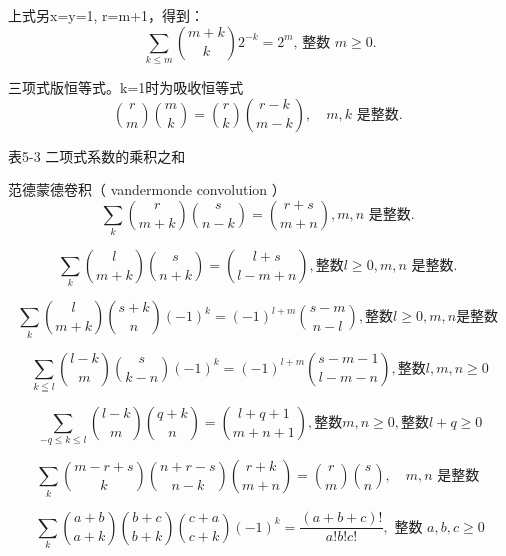 上式另x=y=1, r=m+1，得到：
\begin{equation}
    \sum_{k \leqslant m}{m+k \choose k} 2^{-k}=2^{m} \text {, 整数 } m \geqslant 0 .
\end{equation}

三项式版恒等式。k=1时为吸收恒等式
\begin{equation}
    {r \choose m}{m \choose k}={r \choose k}{r-k \choose m-k}, \quad m, k \text { 是整数. }
\end{equation}

表5-3 二项式系数的乘积之和

范德蒙德卷积（ vandermonde convolution ）
\begin{equation}
    \sum_{k}{r \choose m+k}{s \choose n-k}={r+s \choose m+n}, m, n \text { 是整数. }
\end{equation}

\begin{equation}
    \sum_{k}{l \choose m+k}{s \choose n+k}={l+s \choose l-m+n}, \text {整数} l \geqslant 0, m, n \text { 是整数. }
\end{equation}

\begin{equation}
\sum_{k}{l \choose m+k}{s+k \choose n}(-1)^{k}=(-1)^{l+m}{s-m \choose n-l}, \text{整数} l \geqslant 0, m, n\text{是整数 }
\end{equation}

\begin{equation}
    \sum_{k \leqq l}{l-k \choose m}{s \choose k-n}(-1)^{k}=(-1)^{l+m}{s-m-1 \choose l-m-n}, \text{整数} l, m, n \geqslant 0 
\end{equation}

\begin{equation}
    \sum_{-q \leqslant k \leqslant l}{l-k \choose m}{q+k \choose n}={l+q+1 \choose m+n+1}, \text{整数} m, n \geqslant 0, \text{整数} l+q \geqslant 0
\end{equation}

\setcounter{equation}{27}
\begin{equation}
    \sum_{k}{m-r+s \choose k}{n+r-s \choose n-k}{r+k \choose m+n}={r \choose m}{s \choose n}, \quad m, n \text { 是整数 }
\end{equation}

\begin{equation}
    \sum_{k}{a+b \choose a+k}{b+c \choose b+k}{c+a \choose c+k}(-1)^{k}=\frac{(a+b+c) !}{a ! b ! c !}, \text { 整数 } a, b, c \geqslant 0
\end{equation}

